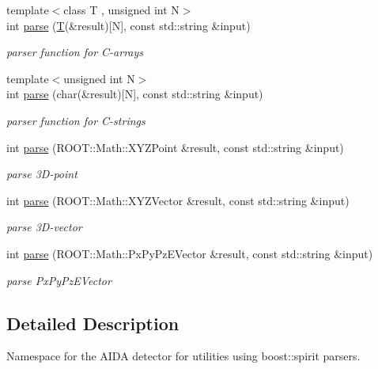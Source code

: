 \begin{DoxyCompactItemize}
{\footnotesize template$<$class T , unsigned int N$>$ }\\int \hyperlink{namespace_d_d4hep_1_1_parsers_a3a2c641257cdea105bf397df609731f5}{parse} (\hyperlink{class_t}{T}(\&result)\mbox{[}N\mbox{]}, const std\+::string \&input)
\begin{DoxyCompactList}\small\item\em parser function for C-\/arrays \end{DoxyCompactList}\item 
{\footnotesize template$<$unsigned int N$>$ }\\int \hyperlink{namespace_d_d4hep_1_1_parsers_a6f63b6224a4074e16a6ff5d851170427}{parse} (char(\&result)\mbox{[}N\mbox{]}, const std\+::string \&input)
\begin{DoxyCompactList}\small\item\em parser function for C-\/strings \end{DoxyCompactList}\item 
int \hyperlink{namespace_d_d4hep_1_1_parsers_a7d90cf46a4c38175eed16be4cbc97d20}{parse} (R\+O\+O\+T\+::\+Math\+::\+X\+Y\+Z\+Point \&result, const std\+::string \&input)
\begin{DoxyCompactList}\small\item\em parse 3\+D-\/point \end{DoxyCompactList}\item 
int \hyperlink{namespace_d_d4hep_1_1_parsers_a55f47fe0c36c09f779f5aeefe17e9bcb}{parse} (R\+O\+O\+T\+::\+Math\+::\+X\+Y\+Z\+Vector \&result, const std\+::string \&input)
\begin{DoxyCompactList}\small\item\em parse 3\+D-\/vector \end{DoxyCompactList}\item 
int \hyperlink{namespace_d_d4hep_1_1_parsers_aa49d5f1a00fb97ffdcac92a067fc14a2}{parse} (R\+O\+O\+T\+::\+Math\+::\+Px\+Py\+Pz\+E\+Vector \&result, const std\+::string \&input)
\begin{DoxyCompactList}\small\item\em parse Px\+Py\+Pz\+E\+Vector \end{DoxyCompactList}\end{DoxyCompactItemize}


\subsection{Detailed Description}
Namespace for the A\+I\+DA detector for utilities using boost\+::spirit parsers. 

